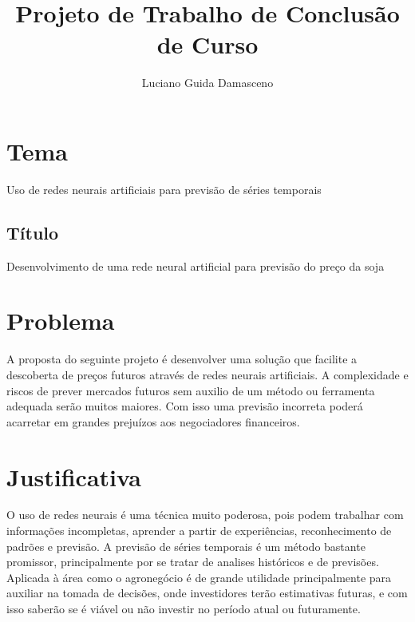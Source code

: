 \documentclass[a4paper,12pt]{article}
\title{Projeto de Trabalho de Conclusão de Curso}
\author{Luciano Guida Damasceno}
\begin{document}
\maketitle


\newpage



\section{Tema}
Uso de redes neurais artificiais para previsão de séries temporais
\subsection{Título}
Desenvolvimento de uma rede neural artificial para previsão do preço da soja


\newpage


\section{Problema}
A proposta do seguinte projeto é desenvolver uma solução que facilite a descoberta de preços futuros através de redes neurais artificiais. A complexidade e riscos de prever mercados futuros sem auxilio de um método ou ferramenta adequada serão muitos maiores. Com isso uma previsão incorreta poderá acarretar em grandes prejuízos aos negociadores financeiros.

\newpage


\section{Justificativa}
\indent O uso de redes neurais é uma técnica muito poderosa, pois podem trabalhar com informações incompletas, aprender a partir de experiências, reconhecimento de padrões e previsão. A previsão de séries temporais é um método bastante promissor, principalmente por se tratar de analises históricos e de previsões. Aplicada à área como o agronegócio é de grande utilidade principalmente para auxiliar na tomada de decisões, onde investidores terão estimativas futuras, e com isso saberão se é viável ou não investir no período atual ou futuramente. 




\newpage
\end{document}
